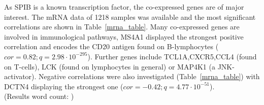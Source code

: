 As SPIB is a known transcription factor, the co-expressed genes are of major interest.
The mRNA data of 1218 samples was available and the most significant correlations are shown in Table~\ref{mrna_table}.
Many co-expressed genes are involved in immunological pathways, MS4A1 displayed the strongest positive correlation and encodes the CD20 antigen found on B-lymphocytes ($cor = 0.82; q = 2.98 \cdot 10^{-295}$).
Further genes include TCL1A,CXCR5,CCL4 (found on T-cells), LCK (found on lymphocytes in general) or MAP4K1 (a JNK-activator).
Negative correlations were also investigated (Table~\ref{mrna_table}) with DCTN4 displaying the strongest one ($cor = -0.42; q = 4.77 \cdot 10^{-51}$).
\\
\endcountem 
(Results word count: \thewordcount{})